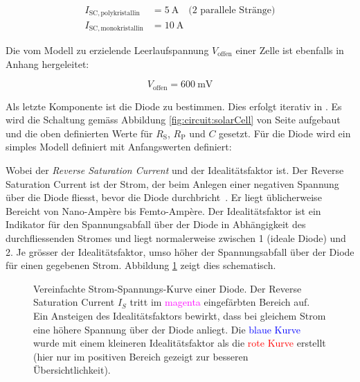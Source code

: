 \begin{align}
    I_{\mathrm{SC, polykristallin}} & = \SI{5}{\ampere} \quad \text{(2 parallele Str\"ange)} \\
    I_{\mathrm{SC, monokristallin}} & = \SI{10}{\ampere}
\end{align}

Die vom Modell zu erzielende Leerlaufspannung $V_{\mathrm{offen}}$ einer Zelle
ist ebenfalls in Anhang \label{app:sec:cell:UI} hergeleitet:

\begin{equation}
    \label{eq:voffen}
    V_{\mathrm{offen}} = \SI{600}{\milli\volt}
\end{equation}


Als   letzte   Komponente   ist   die   Diode   zu   bestimmen. Dies   erfolgt
iterativ  in   . Es  wird   die  Schaltung   gem\"ass  Abbildung
\ref{fig:circuit:solarCell}    von    Seite    \pageref{fig:circuit:solarCell}
aufgebaut   und   die   oben   definierten   Werte   f\"ur   $R_{\mathrm{S}}$,
$R_{\mathrm{P}}$  und $C$  gesetzt. F\"ur die  Diode wird  ein simples  Modell
definiert mit Anfangswerten definiert:


\begin{center}
\end{center}

Wobei  der \emph{Reverse Saturation Current} 
und   der Idealit\"atsfaktor  ist. Der Reverse Saturation  Current ist
der Strom, der beim Anlegen einer negativen Spannung \"uber die Diode fliesst,
bevor die  Diode durchbricht~\cite{ref:solar:diodeCharacteristics}.   Er liegt
\"ublicherweise  Bereicht  von   Nano-Amp\`ere  bis  Femto-Amp\`ere.   Der  Idealit\"atsfaktor  ist  ein
Indikator f\"ur  den Spannungsabfall  \"uber der  Diode in  Abh\"angigkeit des
durchfliessenden Stromes und liegt normalerweise zwischen 1 (ideale Diode) und
2. Je  gr\"osser  der  Idealit\"atsfaktor, umso  h\"oher  der  Spannungsabfall
\"uber der  Diode f\"ur einen gegebenen  Strom. Abbildung \ref{fig:diodeVI:IS}
zeigt dies schematisch.

\begin{figure}[h!tb]
    
    \caption{%
        Vereinfachte Strom-Spannungs-Kurve einer Diode. Der Reverse Saturation
        Current  $I_S$  tritt im  \textcolor{magenta}{magenta}  eingef\"arbten
        Bereich  auf. Ein  Ansteigen  des  Idealit\"atsfaktors  bewirkt,  dass
        bei   gleichem  Strom   eine  h\"ohere   Spannung  \"uber   der  Diode
        anliegt. Die \textcolor{blue}{blaue  Kurve} wurde mit  einem kleineren
        Idealit\"atsfaktor als die  \textcolor{red}{rote Kurve} erstellt (hier
        nur im positiven Bereich gezeigt zur besseren \"Ubersichtlichkeit).%
    }
    \label{fig:diodeVI:IS}
\end{figure}

